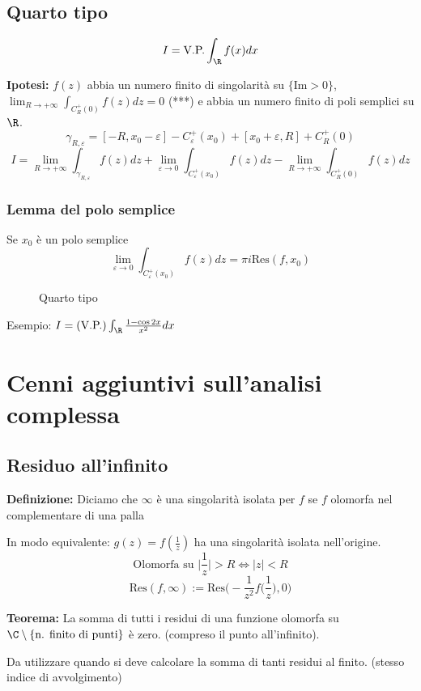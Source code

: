 \subsection{Quarto tipo}
\begin{tcolorbox}
\[I=\text{V.P.}\int_{\R}^{} f(x)dx\]	
\end{tcolorbox}
\textbf{Ipotesi:} $f(z)$ abbia un numero finito di singolarità su $\{\text{Im}>0\} $, \\$\lim_{R \to +\infty} \int_{C_R^+(0)}^{} f(z)dz=0$ (***) e abbia un numero finito di poli semplici su $\R$.
\[\gamma_{R,\varepsilon}=[-R,x_0-\varepsilon]-C_\varepsilon^+(x_0)+[x_0+\varepsilon,R]+C_R^+(0)\]
\[I=\lim_{R \to +\infty} \int_{\gamma_{R,\varepsilon}}f(z)dz + \lim_{\varepsilon \to 0} \int_{C_\varepsilon^+(x_0)}^{} f(z)dz-\lim_{R \to +\infty} \int_{C_R^+(0)}{f(z)dz}\]
\subsubsection{Lemma del polo semplice}
Se $x_0$ è un polo semplice
\[\lim_{\varepsilon \to 0} \int_{C_\varepsilon^+(x_0)}^{} f(z)dz=\pi i \text{Res}(f,x_0)\] 
\begin{figure}[ht]
    \centering
    \caption{Quarto tipo}
    \label{fig:quarto-tipo}
\end{figure}
Esempio: $I=\text{(V.P.)}\int_{\R}^{} \frac{1-\cos 2x}{x^2}dx$
\section{Cenni aggiuntivi sull'analisi complessa}
\subsection{Residuo all'infinito}
\begin{tcolorbox}
	\textbf{Definizione:} Diciamo che $\infty$ è una singolarità isolata per $f$ se $f$ olomorfa nel complementare di una palla
\end{tcolorbox}
In modo equivalente: $g(z)=f(\frac{1}{z})$ ha una singolarità isolata nell'origine.
\[\text{Olomorfa su }\bigg|\frac{1}{z}\bigg|>R\iff |z|<R\]
\[\text{Res}(f,\infty):=\text{Res}\bigg(-\frac{1}{z^2}f\bigg(\frac{1}{z}\bigg),0\bigg)\]
\begin{tcolorbox}
	\textbf{Teorema:} La somma di tutti i residui di una funzione olomorfa su $\C\setminus \{\text{n. finito di punti}\} $ è zero. (compreso il punto all'infinito).
\end{tcolorbox}
Da utilizzare quando si deve calcolare la somma di tanti residui al finito. (stesso indice di avvolgimento)
